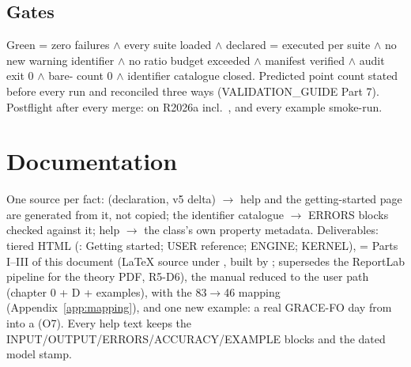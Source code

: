 \section{Gates}

Green = zero failures $\wedge$ every suite loaded $\wedge$ declared = executed per suite $\wedge$ no new warning identifier $\wedge$ no ratio budget exceeded $\wedge$ manifest verified $\wedge$ audit exit 0 $\wedge$ bare- count 0 $\wedge$ identifier catalogue closed. Predicted point count stated before every run and reconciled three ways (VALIDATION\_GUIDE Part 7). Postflight after every merge:  on R2026a incl.\ , and every example smoke-run.

\chapter{Documentation}
\label{ch:docs}

One source per fact:  (declaration, v5 delta) $\to$  help and the getting-started page are generated from it, not copied; the identifier catalogue $\to$ ERRORS blocks checked against it;  help $\to$ the class's own property metadata. Deliverables: tiered HTML (: Getting started; USER reference; ENGINE; KERNEL),  = Parts I--III of this document (LaTeX source under , built by ; supersedes the ReportLab pipeline for the theory PDF, R5-D6), the manual reduced to the user path (chapter 0 + D + examples),  with the 83$\to$46 mapping (Appendix~\ref{app:mapping}), and one new example: a real GRACE-FO day from  into a  (O7). Every help text keeps the INPUT/OUTPUT/ERRORS/ACCURACY/EXAMPLE blocks and the dated model stamp.
